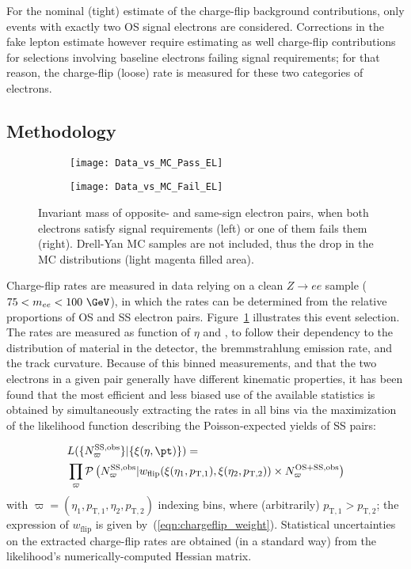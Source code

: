 For the nominal (tight) estimate of the charge-flip background contributions, only events with exactly two OS signal electrons are considered. 
Corrections in the fake lepton estimate however require estimating as well charge-flip contributions for selections involving 
baseline electrons failing signal requirements; 
for that reason, the charge-flip (loose) rate is measured for these two categories of electrons. 

\subsection*{Methodology}
\label{subsec:chargeflip_method}

\begin{figure}[t!]
\centering
\begin{subfigure}[b]{0.45\textwidth}
	\texttt{[image: Data\_vs\_MC\_Pass\_EL]}
\end{subfigure}
\begin{subfigure}[b]{0.45\textwidth}
	\texttt{[image: Data\_vs\_MC\_Fail\_EL]}
\end{subfigure}
\caption{Invariant mass of opposite- and same-sign electron pairs, 
when both electrons satisfy signal requirements (left) or one of them fails them (right). Drell-Yan MC samples are not included, thus the drop in the MC distributions (light magenta filled area).}
\label{fig:chargeflip_mee}
\end{figure}

Charge-flip rates are measured in data relying on a clean $Z\to ee$ sample ($75<m_{ee}<100~\GeV$), 
in which the rates can be determined from the relative proportions of OS and SS electron pairs. 
Figure~\ref{fig:chargeflip_mee} illustrates this event selection. 
The rates are measured as function of $\eta$ and \pt, to follow their dependency to the distribution of material in the detector, 
the bremmstrahlung emission rate, and the track curvature. 
Because of this binned measurements, and that the two electrons in a given pair generally have different kinematic properties, 
it has been found that the most efficient and less biased use of the available statistics 
is obtained by simultaneously extracting the rates in all bins via the maximization of the likelihood function describing the 
Poisson-expected yields of SS pairs: 

\begin{equation}
\begin{aligned}
{} & L(\{N^\text{SS,obs}_\varpi\}|\{\xi(\eta,\pt)\}) 
= \\
& \prod_{\varpi} \mathcal P\left(N^\text{SS,obs}_\varpi|w_\text{flip}(\xi(\eta_1,p_{\mathrm{T},1}),\xi(\eta_2,p_{\mathrm{T},2}))\times N^\text{OS+SS,obs}_\varpi\right)
\label{eqn:chargeflip_likelihood}
\end{aligned}
\end{equation}
with $\varpi=(\eta_1,p_{\mathrm{T},1},\eta_2,p_{\mathrm{T},2})$ indexing bins, where (arbitrarily) $p_{\mathrm{T},1}>p_{\mathrm{T},2}$; 
the expression of $w_\text{flip}$ is given by~(\ref{eqn:chargeflip_weight}). 
Statistical uncertainties on the extracted charge-flip rates are obtained (in a standard way) from the likelihood's numerically-computed Hessian matrix. 

